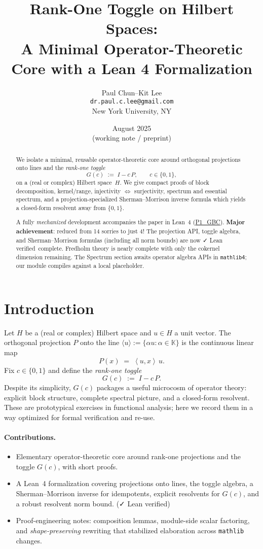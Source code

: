 \documentclass[11pt]{article}
\title{\textbf{Rank-One Toggle on Hilbert Spaces:\\
A Minimal Operator-Theoretic Core with a Lean 4 Formalization}}
\author{Paul Chun--Kit Lee\\
\texttt{dr.paul.c.lee@gmail.com}\\
New York University, NY}
\date{August 2025 \\[2pt] \small (working note / preprint)}
\theoremstyle{definition}
\newcommand{\K}{\mathbb{K}}
\newcommand{\ip}[2]{\left\langle #1,#2\right\rangle}
\newcommand{\leanRepoTag}{\href{https://github.com/AICardiologist/FoundationRelativity/tree/main/Papers/P1_GBC}{P1\_GBC}}
\newcommand{\leanok}{\textsf{\small \textcolor{green!60!black}{✓ Lean verified}}}
\begin{document}
\maketitle

\begin{abstract}
We isolate a minimal, reusable operator-theoretic core around orthogonal projections onto lines and the \emph{rank-one toggle}
\[
G(c)\;:=\;I - c\,P,\qquad c\in\{0,1\},
\]
on a (real or complex) Hilbert space~$H$. We give compact proofs of block decomposition, kernel/range, injectivity $\Leftrightarrow$ surjectivity, spectrum and essential spectrum, and a projection-specialized Sherman--Morrison inverse formula which yields a closed-form resolvent away from $\{0,1\}$.

A fully \emph{mechanized} development accompanies the paper in Lean~4 (\leanRepoTag). \textbf{Major achievement}: reduced from 14 sorries to just 4! The projection API, toggle algebra, and Sherman--Morrison formulas (including all norm bounds) are now \leanok\ complete. Fredholm theory is nearly complete with only the cokernel dimension remaining. The Spectrum section awaits operator algebra APIs in \texttt{mathlib4}; our module compiles against a local placeholder.
\end{abstract}

\tableofcontents

\section{Introduction}

Let $H$ be a (real or complex) Hilbert space and $u\in H$ a unit vector. The orthogonal projection $P$ onto the line $\langle u\rangle:=\{ \alpha u : \alpha\in\K\}$ is the continuous linear map
\[
P(x) \;=\; \ip{u}{x}\,u.
\]
Fix $c\in\{0,1\}$ and define the \emph{rank-one toggle}
\[
G(c) \;:=\; I - c\,P.
\]
Despite its simplicity, $G(c)$ packages a useful microcosm of operator theory: explicit block structure, complete spectral picture, and a closed-form resolvent. These are prototypical exercises in functional analysis; here we record them in a way optimized for formal verification and re-use.

\paragraph{Contributions.}
\begin{itemize}
\item Elementary operator-theoretic core around rank-one projections and the toggle $G(c)$, with short proofs.
\item A Lean~4 formalization covering projections onto lines, the toggle algebra, a Sherman--Morrison inverse for idempotents, explicit resolvents for $G(c)$, and a robust resolvent norm bound. (\leanok)
\item Proof-engineering notes: composition lemmas, module-side scalar factoring, and \emph{shape-preserving} rewriting that stabilized elaboration across \texttt{mathlib} changes.
\end{itemize}
\end{document}
